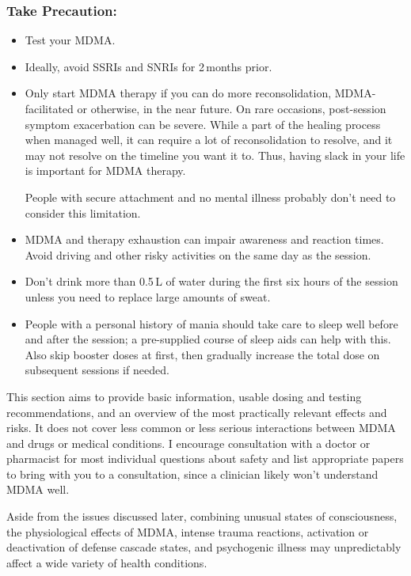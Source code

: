 \documentclass[11pt,oneside]{book}
\begin{document}
\subsubsection*{Take Precaution:}
\begin{itemize}
    \item Test your MDMA.
    \item Ideally, avoid SSRIs and SNRIs for 2\,months prior.
    \item Only start MDMA therapy if you can do more reconsolidation, MDMA-facilitated or otherwise, in the near future. On rare occasions, post-session symptom exacerbation can be severe. While a part of the healing process when managed well, it can require a lot of reconsolidation to resolve, and it may not resolve on the timeline you want it to. Thus, having slack in your life is important for MDMA therapy.
    
    People with secure attachment and no mental illness probably don't need to consider this limitation.
    \item MDMA and therapy exhaustion can impair awareness and reaction times. Avoid driving and other risky activities on the same day as the session.
    \item Don't drink more than 0.5\,L of water during the first six hours of the session unless you need to replace large amounts of sweat.
    \item People with a personal history of mania should take care to sleep well before and after the session; a pre-supplied course of sleep aids can help with this. Also skip booster doses at first, then gradually increase the total dose on subsequent sessions if needed.
\end{itemize}

This section aims to provide basic information, usable dosing and testing recommendations, and an overview of the most practically relevant effects and risks. It does not cover less common or less serious interactions between MDMA and drugs or medical conditions. I encourage consultation with a doctor or pharmacist for most individual questions about safety and list appropriate papers to bring with you to a consultation, since a clinician likely won't understand MDMA well.

Aside from the issues discussed later, combining unusual states of consciousness, the physiological effects of MDMA, intense trauma reactions, activation or deactivation of defense cascade states, and psychogenic illness may unpredictably affect a wide variety of health conditions.
\end{document}
